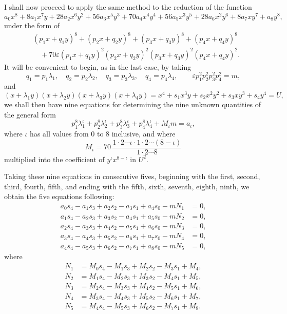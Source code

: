 \documentclass[11pt]{article}
\begin{document}
{{I shall now proceed to apply the same method to the reduction of the function
\[
a_0x^8+8a_1x^7y+28a_2x^6y^2+56a_3x^5y^3+70a_4x^4y^4+56a_5x^3y^5
+28a_6x^2y^6+8a_7xy^7+a_8y^8,
\]
under the form of
\[
\begin{aligned}
&(p_1x+q_1y)^8+(p_2x+q_2y)^8+(p_3x+q_3y)^8+(p_4x+q_4y)^8\\
&\quad +70\varepsilon(p_1x+q_1y)^2(p_2x+q_2y)^2(p_3x+q_3y)^2(p_4x+q_4y)^2.
\end{aligned}
\]
It will be convenient to begin, as in the last case, by taking
\[
q_1=p_1\lambda_1,\quad q_2=p_2\lambda_2,\quad q_3=p_3\lambda_3,\quad q_4=p_4\lambda_4,\qquad
\varepsilon p_1^2p_2^2p_3^2p_4^2=m,
\]
and
\[
(x+\lambda_1y)(x+\lambda_2y)(x+\lambda_3y)(x+\lambda_4y)
=x^4+s_1x^3y+s_2x^2y^2+s_3xy^3+s_4y^4=U,
\]
we shall then have nine equations for determining the nine unknown quantities of the general form
\[
p_1^8\lambda_1^\iota+p_2^8\lambda_2^\iota+p_3^8\lambda_3^\iota+p_4^8\lambda_4^\iota+M_\iota m=a_\iota,
\]
where $\iota$ has all values from 0 to 8 inclusive, and where
\[
M_\iota=70\,\frac{1\cdot2\cdots\iota\cdot1\cdot2\cdots(8-\iota)}{1\cdot2\cdots8}
\]
multiplied into the coefficient of $y^\iota x^{8-\iota}$ in $U^2$.

Taking these nine equations in consecutive fives, beginning with the first, second, third, fourth, fifth, and ending with the fifth, sixth, seventh, eighth, ninth, we obtain the five equations following:
\[
\begin{aligned}
a_0s_4-a_1s_3+a_2s_2-a_3s_1+a_4s_0-mN_1&=0,\\
a_1s_4-a_2s_3+a_3s_2-a_4s_1+a_5s_0-mN_2&=0,\\
a_2s_4-a_3s_3+a_4s_2-a_5s_1+a_6s_0-mN_3&=0,\\
a_3s_4-a_4s_3+a_5s_2-a_6s_1+a_7s_0-mN_4&=0,\\
a_4s_4-a_5s_3+a_6s_2-a_7s_1+a_8s_0-mN_5&=0,
\end{aligned}
\]
where
\[
\begin{aligned}
N_1&=M_0s_4-M_1s_3+M_2s_2-M_3s_1+M_4,\\
N_2&=M_1s_4-M_2s_3+M_3s_2-M_4s_1+M_5,\\
N_3&=M_2s_4-M_3s_3+M_4s_2-M_5s_1+M_6,\\
N_4&=M_3s_4-M_4s_3+M_5s_2-M_6s_1+M_7,\\
N_5&=M_4s_4-M_5s_3+M_6s_2-M_7s_1+M_8.
\end{aligned}
\]

}}
\end{document}
